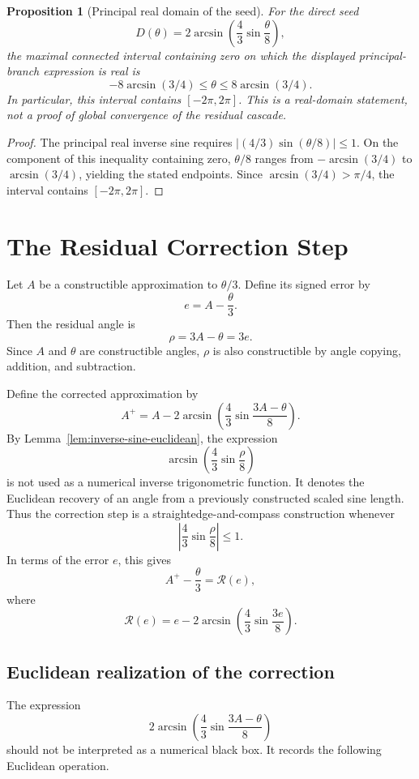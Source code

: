\documentclass[11pt]{article}
\newtheorem{proposition}{Proposition}
\theoremstyle{remark}
\newcommand{\Rop}{\mathscr{R}}
\begin{document}
\begin{proposition}[Principal real domain of the seed]\label{prop:seed-domain}
For the direct seed
\[
D(\theta)=2\arcsin\!\left(\frac43\sin\frac{\theta}{8}\right),
\]
the maximal connected interval containing zero on which the displayed
principal-branch expression is real is
\[
-8\arcsin(3/4)\le\theta\le 8\arcsin(3/4).
\]
In particular, this interval contains $[-2\pi,2\pi]$.  This is a
real-domain statement, not a proof of global convergence of the residual
cascade.
\end{proposition}
\begin{proof}
The principal real inverse sine requires
$|(4/3)\sin(\theta/8)|\le1$.  On the component of this
inequality containing zero, $\theta/8$ ranges from
$-\arcsin(3/4)$ to $\arcsin(3/4)$, yielding the stated
endpoints.  Since $\arcsin(3/4)>\pi/4$, the interval contains
$[-2\pi,2\pi]$.
\end{proof}

\section{The Residual Correction Step}

Let $A$ be a constructible approximation to $\theta/3$. Define its signed error by
\[
e=A-\frac{\theta}{3}.
\]
Then the residual angle is
\[
\rho=3A-\theta=3e.
\]
Since $A$ and $\theta$ are constructible angles, $\rho$ is also constructible by angle copying, addition, and subtraction.

Define the corrected approximation by
\[
A^+
=
A
-
2\arcsin\!\left(
\frac43\sin\frac{3A-\theta}{8}
\right).
\]
By Lemma~\ref{lem:inverse-sine-euclidean}, the expression
\[
\arcsin\!\left(
\frac43\sin\frac{\rho}{8}
\right)
\]
is not used as a numerical inverse trigonometric function.  It denotes the
Euclidean recovery of an angle from a previously constructed scaled sine length.
Thus the correction step is a straightedge-and-compass construction whenever
\[
\left|
\frac43\sin\frac{\rho}{8}
\right|
\le 1.
\]
In terms of the error $e$, this gives
\[
A^+-\frac{\theta}{3}
=
\Rop(e),
\]
where
\[
\Rop(e)
=
e
-
2\arcsin\!\left(
\frac43\sin\frac{3e}{8}
\right).
\]

\subsection{Euclidean realization of the correction}

The expression
\[
2\arcsin\!\left(
\frac43\sin\frac{3A-\theta}{8}
\right)
\]
should not be interpreted as a numerical black box.  It records the following Euclidean
operation.
\end{document}
